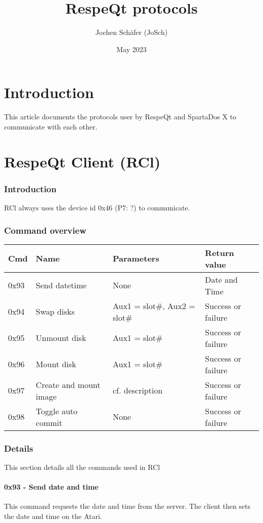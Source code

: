 \documentclass[10pt]{article}
\title{RespeQt protocols}
\author{Jochen Schäfer (JoSch)}
\date{May 2023}
\begin{document}
\maketitle
\tableofcontents

\part{Introduction}
This article documents the protocols user by RespeQt and SpartaDos X to communicate with each other.

\part{RespeQt Client (RCl)}
\section{Introduction}
RCl always uses the device id 0x46 (P7: ?) to communicate. 

\section{Command overview}
\begin{tabular}[h!]{l|l|l|l}
Cmd & Name & Parameters & Return value \\ \hline 
0x93 & Send datetime & None & Date and Time \\
0x94 & Swap disks & Aux1 = slot\#, Aux2 = slot\# & Success or failure \\
0x95 & Unmount disk & Aux1 = slot\# & Success or failure \\
0x96 & Mount disk & Aux1 = slot\# & Success or failure \\
0x97 & Create and mount image & cf. description & Success or failure \\
0x98 & Toggle auto commit & None & Success or failure 
\end{tabular}

\section{Details}
This section details all the commands used in RCl

\subsection{0x93 - Send date and time}
This command requests the date and time from the server.
The client then sets the date and time on the Atari.
\end{document}
